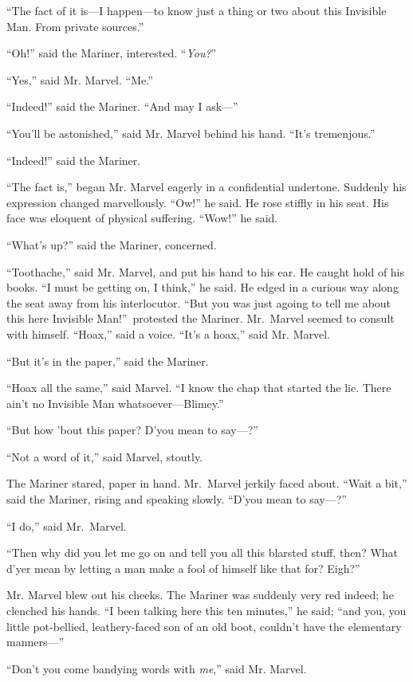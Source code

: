 “The fact of it is—I happen—to know just a thing or two about this Invisible Man. From private sources.”

“Oh!” said the Mariner, interested. “\emph{You?}”

“Yes,” said Mr. Marvel. “Me.”

“Indeed!” said the Mariner. “And may I ask—”

“You’ll be astonished,” said Mr. Marvel behind his hand. “It’s tremenjous.”

“Indeed!” said the Mariner.

“The fact is,” began Mr. Marvel eagerly in a confidential undertone. Suddenly his expression changed marvellously. “Ow!” he said. He rose stiffly in his seat. His face was eloquent of physical suffering. “Wow!” he said.

“What’s up?” said the Mariner, concerned.

“Toothache,” said Mr. Marvel, and put his hand to his ear. He caught hold of his books. “I must be getting on, I think,” he said. He edged in a curious way along the seat away from his interlocutor. “But you was just agoing to tell me about this here Invisible Man!”\ protested the Mariner. Mr.\ Marvel seemed to consult with himself. “Hoax,” said a voice. “It’s a hoax,” said Mr. Marvel.

“But it’s in the paper,” said the Mariner.

“Hoax all the same,” said Marvel. “I know the chap that started the lie. There ain’t no Invisible Man whatsoever—Blimey.”

“But how ’bout this paper? D’you mean to say—?”

“Not a word of it,” said Marvel, stoutly.

The Mariner stared, paper in hand. Mr.\ Marvel jerkily faced about. “Wait a bit,” said the Mariner, rising and speaking slowly. “D’you mean to say—?”

“I do,” said Mr.\ Marvel.

“Then why did you let me go on and tell you all this blarsted stuff, then? What d’yer mean by letting a man make a fool of himself like that for? Eigh?”

Mr. Marvel blew out his cheeks. The Mariner was suddenly very red indeed; he clenched his hands. “I been talking here this ten minutes,” he said; “and you, you little pot-bellied, leathery-faced son of an old boot, couldn’t have the elementary manners—”

“Don’t you come bandying words with \emph{me},” said Mr. Marvel.

